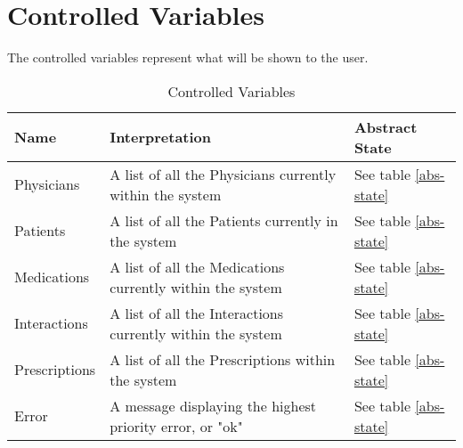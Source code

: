 \section{Controlled Variables}
The controlled variables represent what will be shown to the user.

\begin{table}[h]
\centering
\begin{tabular}{|l|l|l|}
\hline
Name          & Interpretation                                             & Abstract State \\ \hline
Physicians    & A list of all the Physicians currently within the system   & See table \ref{abs-state}  \\ \hline
Patients      & A list of all the Patients currently in the system         & See table \ref{abs-state}  \\ \hline
Medications   & A list of all the Medications currently within the system  & See table \ref{abs-state}  \\ \hline
Interactions  & A list of all the Interactions currently within the system & See table \ref{abs-state}  \\ \hline
Prescriptions & A list of all the Prescriptions within the system          & See table \ref{abs-state}  \\ \hline
Error         & A message displaying the highest priority error, or "ok"     & See table \ref{abs-state}  \\ \hline
\end{tabular}
\caption {Controlled Variables}
\label{tbl:cv}
\end{table}